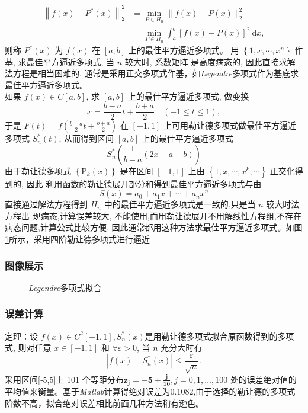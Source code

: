 \documentclass{ctexart}%
\begin{document}
$$
\begin{aligned}
\left\|f(x)-P^{*}(x)\right\|_{2}^{2} &=\min _{P \in H_{n}}\|f(x)-P(x)\|_{2}^{2} \\
&=\min _{P \in H_{n}} \int_{a}^{b}[f(x)-P(x)]^{2} \mathrm{~d} x,
\end{aligned}
$$
则称 $P^{*}(x)$ 为 $f(x)$ 在 $[a, b]$ 上的最佳平方逼近多项式。
用 $\left\{1, x, \cdots, x^{n}\right\}$ 作基, 求最佳平方逼近多项式, 当 $n$ 较大时, 系数矩阵 是高度病态的, 因此直接求解法方程是相当困难的, 通常是采用正交多项式作基，如\textit{Legendre}多项式作为基底求最佳平方逼近多项式。\\
如果 $f(x) \in C[a, b]$, 求 $[a, b]$ 上的最佳平方逼近多项式, 做变换
$$
x=\frac{b-a}{2} t+\frac{b+a}{2} \quad(-1 \leqslant t \leqslant 1),
$$
于是 $F(t)=f\left(\frac{b-a}{2} t+\frac{b+a}{2}\right)$ 在 $[-1,1]$ 上可用勒让德多项式做最佳平方逼近多项式 $S_{n}^{*}(t)$, 从而得到区间 $[a, b]$ 上的最佳平方逼近多项式 $$S_{n}^{*}\left(\frac{1}{b-a}(2 x-a-b)\right)$$
由于勒让德多项式 $\left\{\mathrm{P}_{k}(x)\right\}$ 是在区间 $[-1,1]$ 上由 $\left\{1, x, \cdots, x^{k}, \cdots\right\}$ 正交化得到的, 因此 利用函数的勒让德展开部分和得到最佳平方逼近多项式与由$$
S(x)=a_{0}+a_{1} x+\cdots+a_{n} x^{n}
$$
直接通过解法方程得到 $H_{n}$ 中的最佳平方逼近多项式是一致的,只是当 $n$ 较大时法方程出 现病态,计算误差较大, 不能使用,而用勒让德展开不用解线性方程组,不存在病态问题,计算公式比较方便, 因此通常都用这种方法求最佳平方逼近多项式。如图\ref{legendre}所示，采用四阶勒让德多项式进行逼近
\subsubsection{图像展示}
\begin{figure}[H]
    \centering
    
    \caption{\textit{Legendre}多项式拟合}
    \label{legendre}
\end{figure}

\subsubsection{误差计算}
定理：设 $f(x) \in C^{2}[-1,1], S_{n}^{*}(x)$是用勒让德多项式拟合原函数得到的多项式, 则对任意 $x \in[-1,1]$ 和 $\forall \varepsilon>0$, 当 $n$ 充分大时有
$$
\left|f(x)-S_{n}^{*}(x)\right| \leqslant \frac{\varepsilon}{\sqrt{n}} .
$$
采用区间[‐5,5]上 101 个等距分布$\mathbf{z_j=-5+\frac{j}{10}},j=0,1,...,100$
处的误差绝对值的平均值来衡量。基于\textit{Matlab}计算得绝对误差为0.1082,由于选择的勒让德的多项式阶数不高，拟合绝对误差相比前面几种方法稍有逊色。
\end{document}

